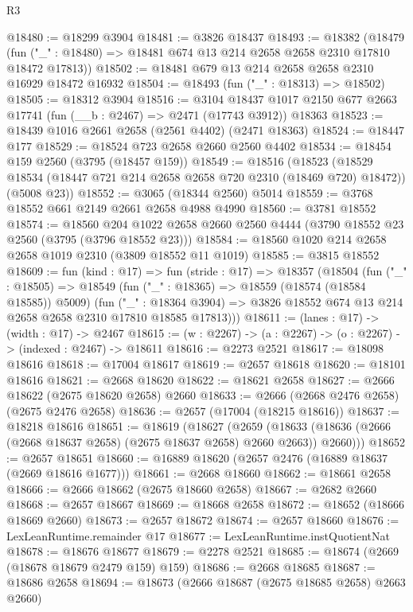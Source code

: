 \begin{lexlean}{R3}
\begin{coremodule}
@18480 := @18299 @3904
@18481 := @3826 @18437
@18493 := @18382
    (@18479 (fun ("_" : @18480) => @18481 @674 @13 @214 @2658 @2658 @2310 @17810 @18472 @17813))
@18502 := @18481 @679 @13 @214 @2658 @2658 @2310 @16929 @18472 @16932
@18504 := @18493 (fun ("_" : @18313) => @18502)
@18505 := @18312 @3904
@18516 := @3104
    @18437
    @1017
    @2150
    @677
    @2663
    @17741
    (fun (__b : @2467) => @2471 (@17743 @3912))
    @18363
@18523 := @18439 @1016 @2661 @2658 (@2561 @4402) (@2471 @18363)
@18524 := @18447 @177
@18529 := @18524 @723 @2658 @2660 @2560 @4402
@18534 := @18454 @159 @2560 (@3795 (@18457 @159))
@18549 := @18516
    (@18523
      (@18529 @18534 (@18447 @721 @214 @2658 @2658 @720 @2310 (@18469 @720) @18472))
      (@5008 @23))
@18552 := @3065 (@18344 @2560) @5014
@18559 := @3768 @18552 @661 @2149 @2661 @2658 @4988 @4990
@18560 := @3781 @18552
@18574 := @18560
    @204
    @1022
    @2658
    @2660
    @2560
    @4444
    (@3790 @18552 @23 @2560 (@3795 (@3796 @18552 @23)))
@18584 := @18560 @1020 @214 @2658 @2658 @1019 @2310 (@3809 @18552 @11 @1019)
@18585 := @3815 @18552
@18609 := fun (kind : @17) =>
  fun (stride : @17) =>
  @18357
    (@18504
      (fun ("_" : @18505) =>
      @18549
        (fun ("_" : @18365) => @18559 (@18574 (@18584 @18585)) @5009)
        (fun ("_" : @18364 @3904) =>
        @3826 @18552 @674 @13 @214 @2658 @2658 @2310 @17810 @18585 @17813)))
@18611 := (lanes : @17) -> (width : @17) -> @2467
@18615 := (w : @2267) -> (a : @2267) -> (o : @2267) -> (indexed : @2467) -> @18611
@18616 := @2273 @2521
@18617 := @18098 @18616
@18618 := @17004 @18617
@18619 := @2657 @18618
@18620 := @18101 @18616
@18621 := @2668 @18620
@18622 := @18621 @2658
@18627 := @2666 @18622 (@2675 @18620 @2658) @2660
@18633 := @2666 (@2668 @2476 @2658) (@2675 @2476 @2658)
@18636 := @2657 (@17004 (@18215 @18616))
@18637 := @18218 @18616
@18651 := @18619
    (@18627
      (@2659 (@18633 (@18636 (@2666 (@2668 @18637 @2658) (@2675 @18637 @2658) @2660 @2663)) @2660)))
@18652 := @2657 @18651
@18660 := @16889 @18620 (@2657 @2476 (@16889 @18637 (@2669 @18616 @1677)))
@18661 := @2668 @18660
@18662 := @18661 @2658
@18666 := @2666 @18662 (@2675 @18660 @2658)
@18667 := @2682 @2660
@18668 := @2657 @18667
@18669 := @18668 @2658
@18672 := @18652 (@18666 @18669 @2660)
@18673 := @2657 @18672
@18674 := @2657 @18660
@18676 := LexLeanRuntime.remainder @17
@18677 := LexLeanRuntime.instQuotientNat
@18678 := @18676 @18677
@18679 := @2278 @2521
@18685 := @18674 (@2669 (@18678 @18679 @2479 @159) @159)
@18686 := @2668 @18685
@18687 := @18686 @2658
@18694 := @18673 (@2666 @18687 (@2675 @18685 @2658) @2663 @2660)

\end{coremodule}
\end{lexlean}
